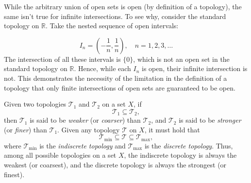 \begin{example}
    While the arbitrary union of open sets is open (by definition of a topology), the same isn't true for infinite intersections. To see why, consider the standard topology on \( \mathbb{R} \). Take the nested sequence of open intervals:
    
    \[
    I_n = \left( -\frac{1}{n}, \frac{1}{n} \right), \quad n = 1, 2, 3, \ldots
    \]
    The intersection of all these intervals is \(\{0\}\), which is not an open set in the standard topology on \( \mathbb{R} \). Hence, while each \( I_n \) is open, their infinite intersection is not. This demonstrates the necessity of the limitation in the definition of a topology that only finite intersections of open sets are guaranteed to be open.
\end{example}



\begin{definition}
    Given two topologies \( \mathcal{T}_1 \) and \( \mathcal{T}_2 \) on a set \( X \), if 
    \[ 
    \mathcal{T}_1 \subseteq \mathcal{T}_2,
    \]
    then \( \mathcal{T}_1 \) is said to be \textit{weaker} (or \textit{coarser}) than \( \mathcal{T}_2 \), and \( \mathcal{T}_2 \) is said to be \textit{stronger} (or \textit{finer}) than \( \mathcal{T}_1 \).
    Given any topology \( \mathcal{T} \) on \( X \), it must hold that 
    \[ 
    \mathcal{T}_{\text{min}} \subseteq \mathcal{T} \subseteq \mathcal{T}_{\text{max}},
    \]
    where \( \mathcal{T}_{\text{min}} \) is the \textit{indiscrete topology} and \( \mathcal{T}_{\text{max}} \) is the \textit{discrete topology}. Thus, among all possible topologies on a set \( X \), the indiscrete topology is always the weakest (or coarsest), and the discrete topology is always the strongest (or finest).
\end{definition}


